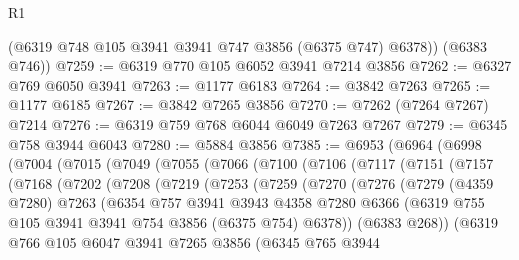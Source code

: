 \begin{lexlean}{R1}
\begin{coremodule}
        (@6319 @748 @105 @3941 @3941 @747 @3856 (@6375 @747) @6378))
      (@6383 @746))
@7259 := @6319 @770 @105 @6052 @3941 @7214 @3856
@7262 := @6327 @769 @6050 @3941
@7263 := @1177 @6183
@7264 := @3842 @7263
@7265 := @1177 @6185
@7267 := @3842 @7265 @3856
@7270 := @7262 (@7264 @7267) @7214
@7276 := @6319 @759 @768 @6044 @6049 @7263 @7267
@7279 := @6345 @758 @3944 @6043
@7280 := @5884 @3856
@7385 := @6953
    (@6964
      (@6998
        (@7004
          (@7015
            (@7049
              (@7055
                (@7066
                  (@7100
                    (@7106
                      (@7117
                        (@7151
                          (@7157
                            (@7168
                              (@7202
                                (@7208
                                  (@7219
                                    (@7253
                                      (@7259
                                        (@7270
                                          (@7276
                                            (@7279
                                              (@4359 @7280)
                                              @7263
                                              (@6354
                                                @757
                                                @3941
                                                @3943
                                                @4358
                                                @7280
                                                @6366
                                                (@6319
                                                  @755
                                                  @105
                                                  @3941
                                                  @3941
                                                  @754
                                                  @3856
                                                  (@6375 @754)
                                                  @6378))
                                              (@6383 @268))
                                            (@6319
                                              @766
                                              @105
                                              @6047
                                              @3941
                                              @7265
                                              @3856
                                              (@6345
                                                @765
                                                @3944

\end{coremodule}
\end{lexlean}
